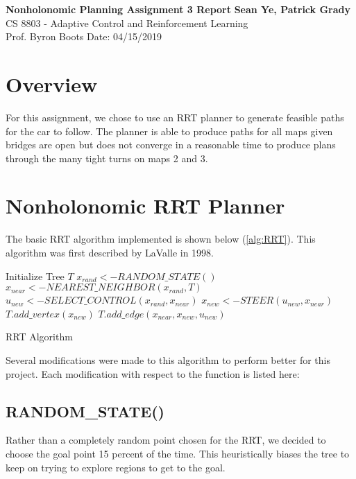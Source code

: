 \documentclass[a4paper, 11pt]{article}
\begin{document}
\noindent
\large\textbf{Nonholonomic Planning Assignment 3 Report} \hfill \textbf{Sean Ye, Patrick Grady} \\
\normalsize CS 8803 - Adaptive Control and Reinforcement Learning \\
Prof. Byron Boots \hfill Date: 04/15/2019 \\

\section{Overview}

For this assignment, we chose to use an RRT planner to generate feasible paths for the car to follow. The planner is able to produce paths for all maps given bridges are open but does not converge in a reasonable time to produce plans through the many tight turns on maps 2 and 3.

\section{Nonholonomic RRT Planner}

The basic RRT algorithm implemented is shown below (\ref{alg:RRT}). This algorithm was first described by LaValle in 1998. \cite{Lavalle98}

\begin{algorithm}[H]
    \begin{algorithmic}
    \State Initialize Tree $T$
    		\State $x_{rand} <- RANDOM\_STATE()$
    		\State $x_{near} <- NEAREST\_NEIGHBOR(x_{rand}, T)$
    		\State $u_{new} <- SELECT\_CONTROL(x_{rand}, x_{near})$
    		\State $x_{new} <- STEER(u_{new}, x_{near})$
    		\State $T.add\_vertex(x_{new})$
    		\State $T.add\_edge(x_{near}, x_{new}, u_{new})$
	\EndWhile    	
    \end{algorithmic}
\caption{RRT Algorithm}
\label{alg:RRT}
\end{algorithm}

Several modifications were made to this algorithm to perform better for this project. Each modification with respect to the function is listed here:

\subsection{RANDOM\_STATE()}
Rather than a completely random point chosen for the RRT, we decided to choose the goal point 15 percent of the time. This heuristically biases the tree to keep on trying to explore regions to get to the goal.
\end{document}
